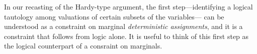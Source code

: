 
In our recasting of the Hardy-type argument, the first step---identifying a logical tautology among valuations of certain subsets of the variables---
can be understood as a constraint on marginal {\em deterministic assignments}, and it is a constraint that follows from logic alone.  
It is useful to think of this first step as the logical counterpart of a consraint on marginals. 





